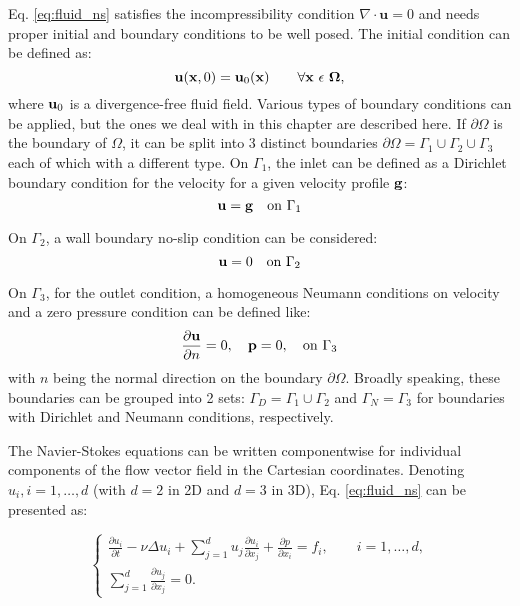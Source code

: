 Eq. \ref{eq:fluid_ns} satisfies the incompressibility condition $\nabla\cdot\mathbf{u}=0$ and needs proper initial and boundary conditions to be well posed. The initial condition can be defined as:
\begin{equation}
{\bf u}({\bf x},0)={\bf u}_{0}({\bf x})\qquad \forall{\bf x}\ \epsilon\ {\bf \Omega,}
\end{equation}
where ${\bf u}_{0}$ is a divergence-free fluid field. Various types of boundary conditions can be applied, but the ones we deal with in this chapter are described here. If $\partial \Omega$ is the boundary of $\Omega$, it can be split into 3 distinct boundaries $\partial \Omega=\Gamma_{1} \cup \Gamma_{2} \cup \Gamma_{3}$ each of which with a different type. On $\Gamma_{1}$, the inlet can be defined as a Dirichlet boundary condition for the velocity for a given velocity profile ${\bf g}$:
\begin{equation}
{\bf u} = {\bf g} \quad \text{on } \Gamma_1
\end{equation}

On $\Gamma_2$, a wall boundary no-slip condition can be considered:
\begin{equation}
{\bf u} = 0 \quad \text{on } \Gamma_2
\end{equation}

On $\Gamma_3$, for the outlet condition, a homogeneous Neumann conditions on velocity and a zero pressure condition can be defined like: 
\begin{equation} \label{eq:fluid_gamma3}
\frac{\partial {\bf u}}{\partial n} = 0, \quad \mathbf{p} = 0, \quad \text{on } \Gamma_3
\end{equation}
with $n$ being the normal direction on the boundary $\partial \Omega$. Broadly speaking, these boundaries can be grouped into 2 sets: $\Gamma_{D} = \Gamma_{1} \cup \Gamma_{2}$ and $\Gamma_{N} = \Gamma_{3}$ for boundaries with Dirichlet and Neumann conditions, respectively.

The Navier-Stokes equations can be written componentwise for individual components of the flow vector field in the Cartesian coordinates. Denoting $u_i, i=1,\ldots,d$ (with $d=2$ in 2D and $d=3$ in 3D), Eq. \ref{eq:fluid_ns} can be presented as:

\begin{equation}
\left\{ {\begin{array}{*{20}{l}}
\displaystyle  {\frac{{\partial {u_i}}}{{\partial t}} - \nu \Delta {u_i} + \mathop \sum \limits_{j = 1}^d {u_j}\frac{{\partial {u_i}}}{{\partial {x_j}}} + \frac{{\partial p}}{{\partial {x_i}}} = {f_i},\qquad i = 1, \ldots ,d,} \\ 
\displaystyle  {\mathop \sum \limits_{j = 1}^d \frac{{\partial {u_j}}}{{\partial {x_j}}} = 0.} 
\end{array}} \right.
\end{equation}


